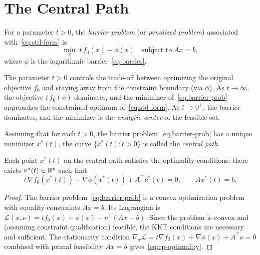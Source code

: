 \documentclass[11pt,a4paper]{article}
\begin{document}

\section{The Central Path}\label{sec:central-path}

\begin{definition}\label{def:barrier-problem}
For a parameter $t > 0$, the \emph{barrier problem} (or \emph{penalized
problem}) associated with~\eqref{eq:std-form} is
\begin{equation}\label{eq:barrier-prob}
  \min_{x}\; t\, f_0(x) + \phi(x)
  \quad \text{subject to}\; Ax = b,
\end{equation}
where $\phi$ is the logarithmic barrier~\eqref{eq:barrier}.
\end{definition}

\begin{remark}[Interpretation of $t$]\label{rem:t-interpretation}
The parameter $t > 0$ controls the trade-off between optimizing the
original objective $f_0$ and staying away from the constraint boundary
(via $\phi$). As $t \to \infty$, the objective $t\,f_0(x)$ dominates,
and the minimizer of~\eqref{eq:barrier-prob} approaches the constrained
optimum of~\eqref{eq:std-form}. As $t \to 0^+$, the barrier dominates,
and the minimizer is the \emph{analytic center} of the feasible set.
\end{remark}

\begin{definition}\label{def:central-path}
Assuming that for each $t > 0$, the barrier
problem~\eqref{eq:barrier-prob} has a unique minimizer $x^*(t)$,
the curve $\{x^*(t) : t > 0\}$ is called the \emph{central path}.
\end{definition}

\begin{proposition}%
\label{prop:central-path-char}
Each point $x^*(t)$ on the central path satisfies the optimality
conditions: there exists $\nu^*(t) \in \mathbb{R}^p$ such that
\begin{equation}\label{eq:cp-optimality}
  t\,\nabla f_0(x^*(t)) + \nabla\phi(x^*(t)) + A^\top\nu^*(t) = 0,
  \qquad Ax^*(t) = b.
\end{equation}
\end{proposition}

\begin{proof}
The barrier problem~\eqref{eq:barrier-prob} is a convex optimization
problem with equality constraints $Ax = b$. Its Lagrangian is
$\mathcal{L}(x, \nu) = t f_0(x) + \phi(x) + \nu^\top(Ax - b)$.
Since the problem is convex and (assuming constraint qualification)
feasible, the KKT conditions are necessary and sufficient. The
stationarity condition
$\nabla_x \mathcal{L} = t\nabla f_0(x) + \nabla\phi(x) + A^\top\nu = 0$
combined with primal feasibility $Ax = b$
gives~\eqref{eq:cp-optimality}.
\end{proof}
\end{document}
